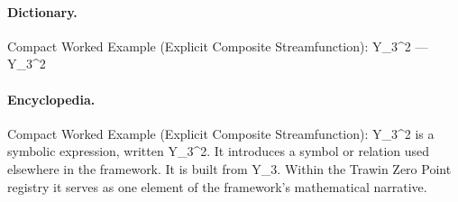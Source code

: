 \paragraph{Dictionary.}
Compact Worked Example (Explicit Composite Streamfunction): Y\_3\textasciicircum{}2 — Y\_3\textasciicircum{}2

\paragraph{Encyclopedia.}
Compact Worked Example (Explicit Composite Streamfunction): Y\_3\textasciicircum{}2 is a symbolic expression, written Y\_3\textasciicircum{}2. It introduces a symbol or relation used elsewhere in the framework. It is built from Y\_3. Within the Trawin Zero Point registry it serves as one element of the framework's mathematical narrative.
